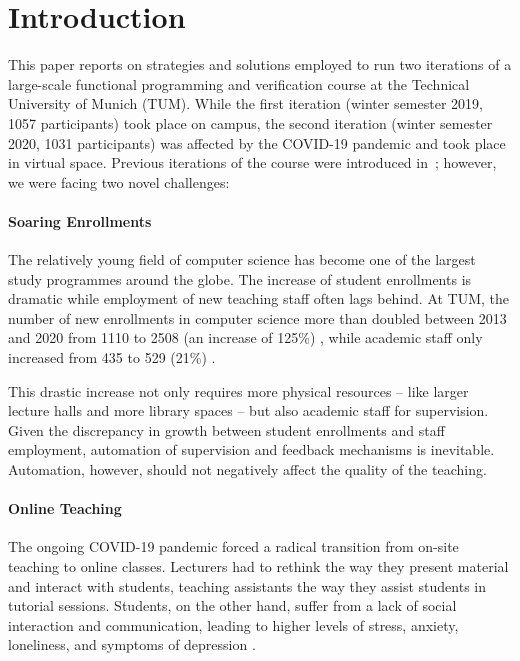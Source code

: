 \section{Introduction}

This paper reports on strategies and solutions employed to
run two iterations of a large-scale functional programming and verification course at the Technical University of Munich (TUM).
While the first iteration (winter semester 2019, 1057 participants)
took place on campus,
the second iteration (winter semester 2020, 1031 participants) was affected by the COVID-19 pandemic and took place in virtual space.
Previous iterations of the course were introduced in~\cite{next_1100};
however, we were facing two novel challenges:

\paragraph{Soaring Enrollments}
The relatively young field of computer science has
become one of the largest study programmes around the globe.
The increase of student enrollments is dramatic
\cite{comp_sci_growth1,comp_sci_growth2}
while employment of new teaching staff often lags behind.
At TUM, the number of new enrollments in computer science more than doubled between 2013 and 2020 from 1110 to 2508 (an increase of 125\%)
, while academic staff only increased from 435 to 529 (21\%) \cite{tum_numbers}.

This drastic increase not only requires more physical resources -- like larger lecture halls and more library spaces --
but also academic staff for supervision.
Given the discrepancy in growth between student enrollments and staff employment,
automation of supervision and feedback mechanisms is inevitable.
Automation, however, should not
negatively affect the quality of the teaching.

\paragraph{Online Teaching}
The ongoing COVID-19 pandemic forced a radical
transition from on-site teaching to online classes.
Lecturers had to rethink the way they present material and interact with students,
teaching assistants the way they assist students in tutorial sessions.
Students, on the other hand, suffer from a lack of social interaction and communication, leading to higher
levels of stress, anxiety, loneliness, and symptoms of depression \cite{students_lockdown1}.

